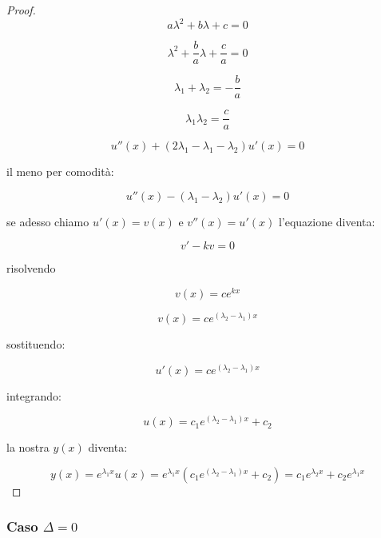 \begin{proof}
    \[
        a \lambda^{2} + b \lambda + c =0
    \]

    \[
        \lambda^{2} + \frac{b}{a} \lambda + \frac{c}{a} =0
    \]

    \[
        \lambda_1 + \lambda_2 = -\frac{b}{a}
    \]

    \[
        \lambda_1 \lambda_2 = \frac{c}{a}
    \]

    \[
        u''(x) + (2 \lambda_1 - \lambda_1 - \lambda_2)u'(x) = 0
    \]

    il meno per comodità:

    \[
        u''(x) - (\lambda_1 - \lambda_2)u'(x) = 0
    \]

    se adesso chiamo \(u'(x)=v(x)\) e \(v''(x) = u'(x)\) l'equazione diventa:

    \[
        v' -kv = 0
    \]

    risolvendo

    \[
        v(x) = ce ^{kx}
    \]

    \[
        v(x) = c e^{(\lambda_2 - \lambda_1)x}
    \]

    sostituendo:

    \[
        u'(x) = c e ^{(\lambda_2- \lambda_1)x}
    \]

    integrando:

    \[
        u(x)  = c_1 e ^{(\lambda_2 - \lambda_1)x}+c_2
    \]

    la nostra \(y(x)\) diventa:

    \[
        y(x) = e ^{\lambda_1 x}u(x) = e ^{\lambda_1 x}( c_1 e ^{(\lambda_2 - \lambda_1)x}+c_2) = c_1 e ^{\lambda_2 x}+ c_2 e ^{\lambda_1 x}
    \]
\end{proof}

\filbreak{}

\subsubsection*{Caso \(\Delta = 0\)}

